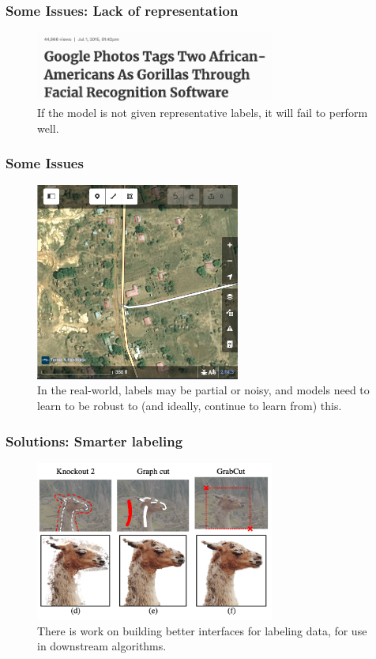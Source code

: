 \documentclass[10pt,mathserif]{beamer}
\begin{document}
\begin{frame}
  \frametitle{Some Issues: Lack of representation}
\begin{figure}[ht]
  \centering
  \includegraphics[width=0.7\textwidth]{figures/unrepresentative}
  \caption{If the model is not given representative labels, it will fail to
    perform well. \label{fig:label} }
\end{figure}
\end{frame}

\begin{frame}
  \frametitle{Some Issues}
\begin{figure}[ht]
  \centering
  \includegraphics[width=0.6\textwidth]{figures/labeling}
  \caption{In the real-world, labels may be partial or noisy, and models need to
    learn to be robust to (and ideally, continue to learn from) this.}
\end{figure}
\end{frame}

\begin{frame}
  \frametitle{Solutions: Smarter labeling}
\begin{figure}[ht]
  \centering
  \includegraphics[width=0.7\textwidth]{figures/grabcut}
  \caption{There is work on building better interfaces for labeling data, for
    use in downstream algorithms. \label{fig:label} }
\end{figure}
\end{frame}
\end{document}

